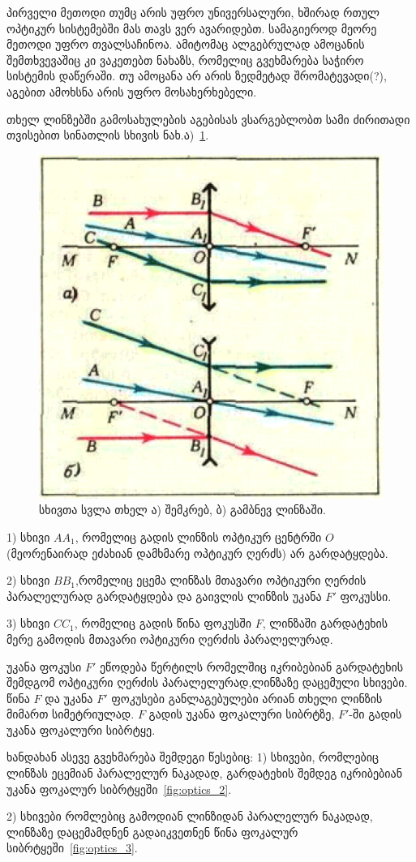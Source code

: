 \documentclass[a4paper]{book}
\begin{document}
პირველი მეთოდი თუმც არის უფრო უნივერსალური, ხშირად რთულ ოპტიკურ სისტემებში მას თავს ვერ ავარიდებთ. სამაგიეროდ მეორე მეთოდი უფრო თვალსაჩინოა. ამიტომაც ალგებრულად ამოცანის შემთხვევაშიც კი ვაკეთებთ ნახაზს, რომელიც გვეხმარება საჭირო სისტემის დაწერაში. თუ ამოცანა არ არის ზედმეტად შრომატევადი(?), აგებით ამოხსნა არის უფრო მოსახერხებელი.

თხელ ლინზებში გამოსახულების აგებისას ვსარგებლობთ სამი ძირითადი თვისებით სინათლის სხივის ნახ.ა)~\ref{fig:optics_1}.
		\begin{figure}[h]
		   \centering
           \includegraphics[width=0.5\columnwidth]{figures/optics_1}
           \caption{სხივთა სვლა თხელ ა) შემკრებ, ბ) გამბნევ ლინზაში.}
           \label{fig:optics_1}
        \end{figure}

1) სხივი $AA_1$, რომელიც გადის ლინზის ოპტიკურ ცენტრში $O$ (მეორენაირად ეძახიან დამხმარე ოპტიკურ ღერძს) არ გარდატყდება.

2) სხივი $BB_1$,რომელიც ეცემა ლინზას მთავარი ოპტიკური ღერძის პარალელურად გარდატყდება და გაივლის ლინზის უკანა $F'$ ფოკუსსი.

3) სხივი $CC_1$, რომელიც გადის წინა ფოკუსში $F$, ლინზაში გარდატეხის მერე გამოდის მთავარი ოპტიკური ღერძის პარალელურად.

უკანა ფოკუსი $F'$ ეწოდება წერტილს რომელშიც იკრიბებიან გარდატეხის შემდგომ ოპტიკური ღერძის პარალელურად,ლინზაზე დაცემული სხივები. წინა $F$ და უკანა $F'$ ფოკუსები განლაგებულები არიან თხელი ლინზის მიმართ სიმეტრიულად. $F$ გადის უკანა ფოკალური სიბრტზე, $F'$-ში გადის უკანა ფოკალური სიბრტყე.

ხანდახან ასევე გვეხმარება შემდეგი წესებიც:
1) სხივები, რომლებიც ლინზას ეცემიან პარალელურ ნაკადად, გარდატეხის შემდეგ იკრიბებიან უკანა ფოკალურ სიბრტყეში~\ref{fig:optics_2}.

2) სხივები რომლებიც გამოდიან ლინზიდან პარალელურ ნაკადად, ლინზაზე დაცემამდნენ გადაიკვეთნენ წინა ფოკალურ სიბრტყეში~\ref{fig:optics_3}. 
\end{document}

